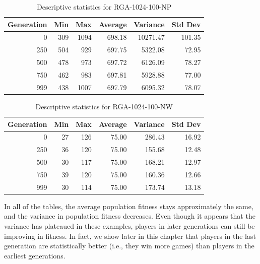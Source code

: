 \begin{table}[ht]
\begin{center}
\caption[RGA-1024-100-NP statistics]{Descriptive statistics for RGA-1024-100-NP}
\begin{tabular}{ | r || r | r | r | r | r |}
\hline                        
Generation & Min & Max & Average & Variance & Std Dev \\ \hline \hline
0   & 309 & 1094 & 698.18 &  10271.47 & 101.35 \\ \hline
250 & 504 &  929 & 697.75 &   5322.08 &  72.95 \\ \hline
500 & 478 &  973 & 697.72 &   6126.09 &  78.27 \\ \hline
750 & 462 &  983 & 697.81 &   5928.88 &  77.00 \\ \hline
999 & 438 & 1007 & 697.79 &   6095.32 &  78.07 \\ \hline
\end{tabular}
\label{table-stats-for-s1024-n100-np}
\end{center}
\end{table}

\begin{table}[ht]
\begin{center}
\caption[RGA-1024-100-NW statistics]{Descriptive statistics for RGA-1024-100-NW}
\begin{tabular}{ | r || r | r | r | r | r |}
\hline                        
Generation & Min & Max & Average & Variance & Std Dev \\ \hline \hline
0   & 27 & 126 & 75.00 & 286.43 & 16.92 \\ \hline
250 & 36 & 120 & 75.00 & 155.68 & 12.48 \\ \hline
500 & 30 & 117 & 75.00 & 168.21 & 12.97 \\ \hline
750 & 39 & 120 & 75.00 & 160.36 & 12.66 \\ \hline
999 & 30 & 114 & 75.00 & 173.74 & 13.18 \\ \hline
\end{tabular}
\label{table-stats-for-s1024-n100-nw}
\end{center}
\end{table}

In all of the tables, the average population fitness stays approximately
the same, and the variance in population fitness decreases. Even though it
appears that the variance has plateaued in these examples, players in later
generations can still be improving in fitness. In fact, we show later in this
chapter that players in the last generation are statistically better (i.e., they
win more games) than players in the earliest generations.

